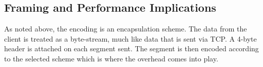 \subsection{Framing and Performance Implications}
As noted above, the encoding is an encapsulation scheme. The data from the client is treated as a byte-stream, much like data that is sent via TCP. A 4-byte header is attached on each segment sent. The segment is then encoded according to the selected scheme which is where the overhead comes into play. 





